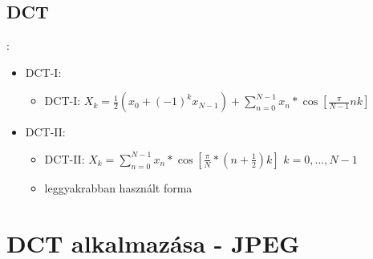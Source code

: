 \documentclass{beamer}
\begin{document}
\subsection{DCT}
\begin{frame}{\secname : \subsecname}
    \begin{itemize}
        \item DCT-I:
        \begin{itemize}
            \item DCT-I: $ X_k = \frac{1}{2} (x_0 + (-1)^kx_{N-1}) + \sum_{n=0}^{N - 1} x_n * \cos[\frac{\pi}{N - 1} nk]$
        \end{itemize}
        \item DCT-II:
        \begin{itemize}
            \item DCT-II: $ X_k = \sum_{n=0}^{N - 1} x_n * \cos[\frac{\pi}{N} * (n + \frac{1}{2})k] $ $k=0,...,N-1$
            \item leggyakrabban használt forma
        \end{itemize}
    \end{itemize}
    
\end{frame}


\section{DCT alkalmazása - JPEG}
\end{document}
